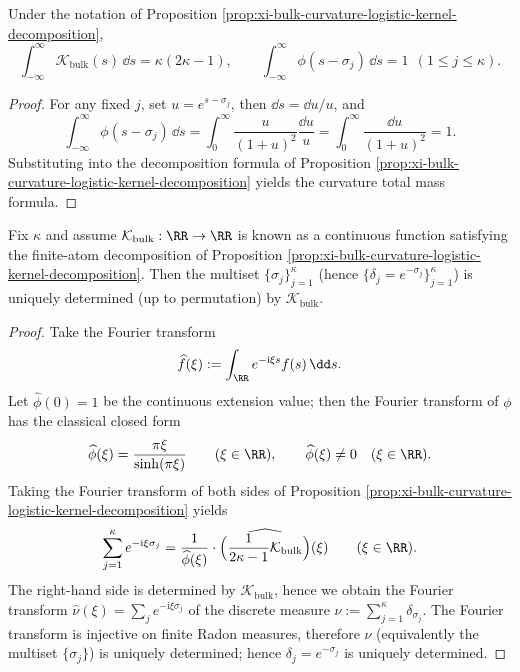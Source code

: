 \begin{corollary}[Total mass quantization of entropy curvature: \texorpdfstring{$\int\mathcal{K}_{\mathrm{bulk}}=\kappa(2\kappa-1)$}{int K_bulk = k(2k-1)}]\label{cor:xi-bulk-curvature-mass-quantization}
Under the notation of Proposition \ref{prop:xi-bulk-curvature-logistic-kernel-decomposition},
\[
\boxed{\;
\int_{-\infty}^{\infty}\mathcal{K}_{\mathrm{bulk}}(s)\,\dd s=\kappa(2\kappa-1),
\qquad
\int_{-\infty}^{\infty}\phi(s-\sigma_j)\,\dd s=1\ \ (1\le j\le\kappa).\;}
\]
\end{corollary}
\begin{proof}
For any fixed \(j\), set \(u=e^{s-\sigma_j}\), then \(\dd s=\dd u/u\), and
\[
\int_{-\infty}^{\infty}\phi(s-\sigma_j)\,\dd s
=\int_{0}^{\infty}\frac{u}{(1+u)^2}\frac{\dd u}{u}
=\int_{0}^{\infty}\frac{\dd u}{(1+u)^2}
=1.
\]
Substituting into the decomposition formula of Proposition \ref{prop:xi-bulk-curvature-logistic-kernel-decomposition} yields the curvature total mass formula.
\end{proof}

\begin{proposition}\label{prop:xi-bulk-curvature-tomography-identifiability}
Fix \(\kappa\) and assume \(\mathcal{K}_{\mathrm{bulk}}:\RR\to\RR\) is known as a continuous function satisfying the finite-atom decomposition of Proposition \ref{prop:xi-bulk-curvature-logistic-kernel-decomposition}.
Then the multiset \(\{\sigma_j\}_{j=1}^{\kappa}\) (hence \(\{\delta_j=e^{-\sigma_j}\}_{j=1}^{\kappa}\)) is uniquely determined (up to permutation) by \(\mathcal{K}_{\mathrm{bulk}}\).
\end{proposition}
\begin{proof}
Take the Fourier transform
\[
\widehat f(\xi):=\int_{\RR}e^{-\mathrm{i}\xi s}f(s)\,\dd s.
\]
Let \(\widehat\phi(0)=1\) be the continuous extension value; then the Fourier transform of \(\phi\) has the classical closed form
\[
\widehat\phi(\xi)=\frac{\pi\xi}{\sinh(\pi\xi)}\qquad(\xi\in\RR),
\qquad
\widehat\phi(\xi)\neq 0\quad(\xi\in\RR).
\]
Taking the Fourier transform of both sides of Proposition \ref{prop:xi-bulk-curvature-logistic-kernel-decomposition} yields
\[
\sum_{j=1}^{\kappa}e^{-\mathrm{i}\xi\sigma_j}
=\frac{1}{\widehat\phi(\xi)}\cdot
\widehat{\Bigl(\frac{1}{2\kappa-1}\mathcal{K}_{\mathrm{bulk}}\Bigr)}(\xi)
\qquad(\xi\in\RR).
\]
The right-hand side is determined by \(\mathcal{K}_{\mathrm{bulk}}\), hence we obtain the Fourier transform \(\widehat\nu(\xi)=\sum_j e^{-\mathrm{i}\xi\sigma_j}\) of the discrete measure \(\nu:=\sum_{j=1}^{\kappa}\delta_{\sigma_j}\).
The Fourier transform is injective on finite Radon measures, therefore \(\nu\) (equivalently the multiset \(\{\sigma_j\}\)) is uniquely determined; hence \(\delta_j=e^{-\sigma_j}\) is uniquely determined.
\end{proof}

